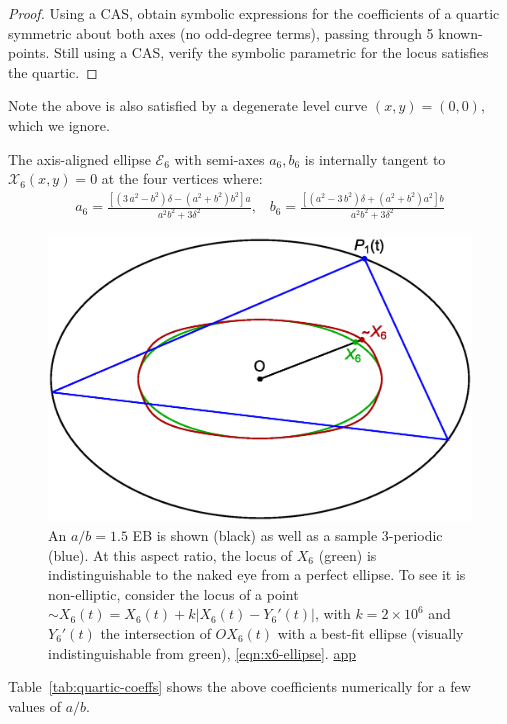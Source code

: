 \begin{proof}
Using a CAS, obtain symbolic expressions for the coefficients of a quartic symmetric about both axes (no odd-degree terms), passing through 5 known-points. Still using a CAS, verify the symbolic parametric for the locus satisfies the quartic.
\end{proof}

 \noindent Note the above is also satisfied by a degenerate level curve $(x,y)=(0,0)$, which we ignore.

\begin{remark}
The axis-aligned ellipse $\mathcal{E}_6$ with semi-axes $a_6,b_6$ is internally tangent to $\mathcal{X}_6(x,y)=0$ at the four vertices where:
{\small  
\begin{align}
a_6= \frac{\left[(3\,a^2-b^2)\delta -(a^2+b^2)b^2\right]a}{a^2b^2+3\delta^2},\;\;\;
b_6= \frac{\left[(a^2-3\,b^2)\delta + (a^2+b^2)a^2\right]b}{a^2b^2+3\delta^2}
\label{eqn:x6-ellipse}
\end{align}
}
\end{remark}

\begin{figure}
    \centering
    \includegraphics[width=.6\textwidth]{pics_1110_symmedian.eps}
    \caption{An $a/b=1.5$ EB is shown (black) as well as a sample 3-periodic (blue). At this aspect ratio, the locus of $X_6$ (green) is indistinguishable to the naked eye from a perfect ellipse. To see it is non-elliptic, consider the locus of a point ${\sim}X_6(t)=X_6(t)+k|X_6(t)-Y_6'(t)|$, with $k=2{\times}10^6$ and $Y_6'(t)$ the intersection of $OX_6(t)$ with a best-fit ellipse (visually indistinguishable from green), \eqref{eqn:x6-ellipse}. \href{https://bit.ly/3qc0Z0L}{app}}
    \label{fig:symmedian}
\end{figure}

Table~\ref{tab:quartic-coeffs} shows the above coefficients numerically for a few values of $a/b$.

